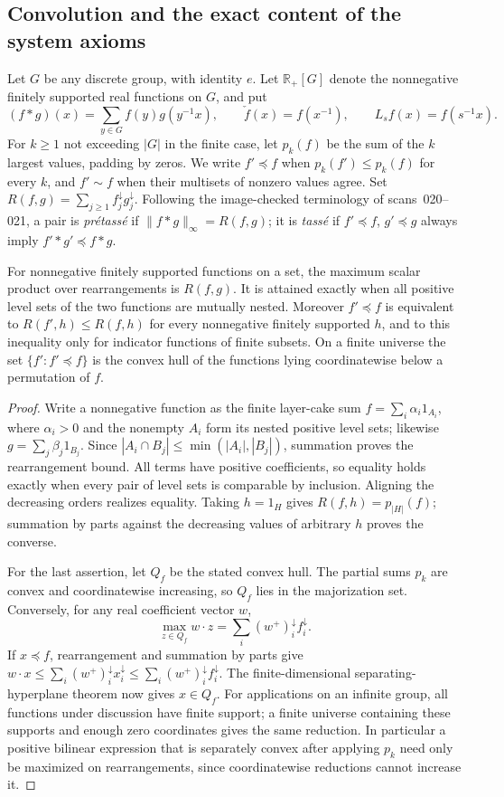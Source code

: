 \subsection{Convolution and the exact content of the system axioms}
Let $G$ be any discrete group, with identity $e$. Let $\mathbb R_+[G]$ denote the nonnegative finitely supported real functions on $G$, and put
\[
(f*g)(x)=\sum_{y\in G}f(y)g(y^{-1}x),\qquad
\check f(x)=f(x^{-1}),\qquad L_s f(x)=f(s^{-1}x).
\]
For $k\geq1$ not exceeding $|G|$ in the finite case, let $p_k(f)$ be the sum of the $k$ largest values, padding by zeros. We write $f'\preceq f$ when $p_k(f')\leq p_k(f)$ for every $k$, and $f'\sim f$ when their multisets of nonzero values agree. Set
$R(f,g)=\sum_{j\geq1}f_j^\downarrow g_j^\downarrow$.
Following the image-checked terminology of scans~020--021, a pair is \emph{pr\'etass\'e} if $\|f*g\|_\infty=R(f,g)$; it is \emph{tass\'e} if $f'\preceq f$, $g'\preceq g$ always imply $f'*g'\preceq f*g$.

\begin{lemma}
\label{C:majorization}
For nonnegative finitely supported functions on a set, the maximum scalar product over rearrangements is $R(f,g)$. It is attained exactly when all positive level sets of the two functions are mutually nested. Moreover $f'\preceq f$ is equivalent to
$R(f',h)\leq R(f,h)$ for every nonnegative finitely supported $h$, and to this inequality only for indicator functions of finite subsets. On a finite universe the set $\{f':f'\preceq f\}$ is the convex hull of the functions lying coordinatewise below a permutation of $f$.
\end{lemma}
\begin{proof}
Write a nonnegative function as the finite layer-cake sum
$f=\sum_i\alpha_i1_{A_i}$, where $\alpha_i>0$ and the nonempty $A_i$ form its nested positive level sets; likewise $g=\sum_j\beta_j1_{B_j}$. Since $|A_i\cap B_j|\leq\min(|A_i|,|B_j|)$, summation proves the rearrangement bound. All terms have positive coefficients, so equality holds exactly when every pair of level sets is comparable by inclusion. Aligning the decreasing orders realizes equality. Taking $h=1_H$ gives $R(f,h)=p_{|H|}(f)$; summation by parts against the decreasing values of arbitrary $h$ proves the converse.

For the last assertion, let $Q_f$ be the stated convex hull. The partial sums $p_k$ are convex and coordinatewise increasing, so $Q_f$ lies in the majorization set. Conversely, for any real coefficient vector $w$,
\[
\max_{z\in Q_f}w\cdot z
 =\sum_i(w^+)^\downarrow_i f_i^\downarrow.
\]
If $x\preceq f$, rearrangement and summation by parts give
$w\cdot x\leq\sum_i(w^+)^\downarrow_i x_i^\downarrow
\leq\sum_i(w^+)^\downarrow_i f_i^\downarrow$.
The finite-dimensional separating-hyperplane theorem now gives $x\in Q_f$. For applications on an infinite group, all functions under discussion have finite support; a finite universe containing these supports and enough zero coordinates gives the same reduction. In particular a positive bilinear expression that is separately convex after applying $p_k$ need only be maximized on rearrangements, since coordinatewise reductions cannot increase it.
\end{proof}

